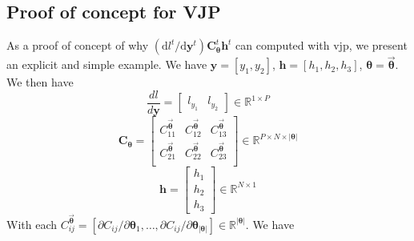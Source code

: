 \documentclass{article}
\newcommand{\R}{\mathbb{R}}
\newcommand{\vjp}{\mathrm{vjp}}
\newcommand{\diff}{\mathrm{d}}
\begin{document}
\subsection{Proof of concept for VJP}
As a proof of concept of why $(\diff l^t/\diff \mathbf{y}^t) \mathbf{C}^t_{\boldsymbol{\theta}} \mathbf{h}^t$ can computed with $\vjp$, we present an explicit and simple example. 
We have $\mathbf{y}=[y_1,y_2]$, $\mathbf{h}=[h_1,h_2,h_3]$, $\boldsymbol{\theta}=\Vec{\boldsymbol{\theta}}$. 
We then have 
\[
\frac{dl}{d\mathbf{y}}=
\begin{bmatrix}
    l_{y_1} & l_{y_2}
\end{bmatrix}\in\R^{1\times P}
\]
\[
\mathbf{C}_{\boldsymbol{\theta}}=
\begin{bmatrix}
    C_{11}^{\Vec{\boldsymbol{\theta}}} & C_{12}^{\Vec{\boldsymbol{\theta}}} & C_{13}^{\Vec{\boldsymbol{\theta}}}\\
    C_{21}^{\Vec{\boldsymbol{\theta}}} & C_{22}^{\Vec{\boldsymbol{\theta}}} & C_{23}^{\Vec{\boldsymbol{\theta}}}\\
\end{bmatrix}\in\R^{P\times N\times |\boldsymbol{\theta}|}
\]
\[
\mathbf{h} = 
\begin{bmatrix}
    h_1\\
    h_2\\
    h_3
\end{bmatrix} \in\R^{N\times 1}
\]
With each $C_{ij}^{\Vec{\boldsymbol{\theta}}}=[\partial C_{ij}/\partial \boldsymbol{\theta}_1, \dots,\partial C_{ij}/\partial \boldsymbol{\theta}_{|\boldsymbol{\theta}|}]\in\R^{|\boldsymbol{\theta}|}$.
We have 
\end{document}
